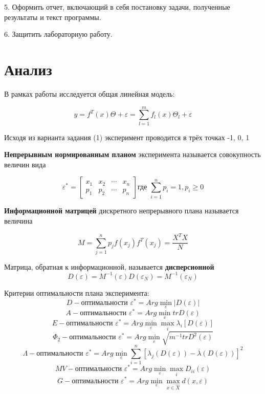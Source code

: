 5.	Оформить отчет, включающий в себя постановку задачи, полученные результаты и текст программы.

6.	Защитить лабораторную работу. 


\section{Анализ}

В рамках работы исследуется общая линейная модель:

\[
y = f^T(x)\Theta + \varepsilon = \sum_{l=1}^m f_l(x)\Theta_l + \varepsilon
\]

Исходя из варианта задания (1) эксперимент проводится в трёх точках -1, 0, 1

{\bf Непрерывным нормированным планом} эксперимента называется совокупность величин вида

\[
	\varepsilon^*=
	\begin{bmatrix}
	    x_1		&	x_2		&	\cdots		&	x_n	\\
 	    p_1		&	p_2		&	\cdots		&	p_n
	\end{bmatrix}
	\text{где } \sum_{i=1}^n p_i = 1, p_i \geq 0
\] 

{\bf Информационной матрицей} дискретного непрерывного плана называется величина

\[M = \sum_{j=1}^n p_j f(x_j)f^T(x_j) = \frac{X^T X}{N}\]

Матрица, обратная к информационной, называется {\bf дисперсионной}
\[ D(\varepsilon)=M^{-1}(\varepsilon) D(\varepsilon_N)=M^{-1}(\varepsilon_N) \]

Критерии оптимальности плана эксперимента:
\[ D-\text{оптимальности } \varepsilon^* = Arg \min_{\varepsilon} |D(\varepsilon)| \]
\[ A-\text{оптимальности } \varepsilon^* = Arg \min_{\varepsilon} tr D(\varepsilon) \]
\[ E-\text{оптимальности } \varepsilon^* = Arg \min_{\varepsilon} \max_i \lambda_i[D(\varepsilon)] \]
\[ \Phi_2-\text{оптимальности } \varepsilon^* = Arg \min_{\varepsilon} \sqrt{m^{-1} tr D^2(\varepsilon)} \]
\[ \Lambda-\text{оптимальности } \varepsilon^* = Arg \min_{\varepsilon} \sum_{i=1}^n [ \lambda_j(D(\varepsilon)) - \overline{\lambda}(D(\varepsilon)) ]^2 \]
\[ MV-\text{оптимальности } \varepsilon^* = Arg \min_{\varepsilon} \max_i D_{ii}(\varepsilon) \]
\[ G-\text{оптимальности } \varepsilon^* = Arg \min_{\varepsilon} \max_{x \in \hat{X}} d(x, \varepsilon) \]


